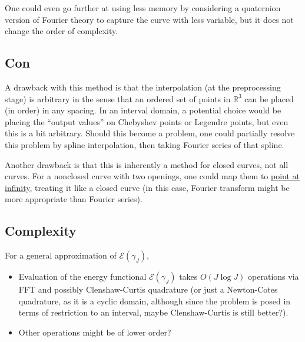 \documentclass[a4paper]{article}
\begin{document}
One could even go further at using less memory by considering a quaternion version of Fourier theory to capture the curve with less variable, but it does not change the order of complexity.

\subsection{Con}
A drawback with this method is that the interpolation (at the preprocessing stage) is arbitrary in the sense that an ordered set of points in $\mathbb{R}^3$ can be placed (in order) in any spacing.
In an interval domain, a potential choice would be placing the ``output values'' on Chebyshev points or Legendre points, but even this is a bit arbitrary.
Should this become a problem, one could partially resolve this problem by spline interpolation, then taking Fourier series of that spline.

Another drawback is that this is inherently a method for closed curves, not all curves. For a nonclosed curve with two openings, one could map them to \underline{point at infinity}, treating it like a closed curve (in this case, Fourier transform might be more appropriate than Fourier series).


\subsection{Complexity}
For a general approximation of $\mathcal{E}\left( \gamma_J \right)$,
\begin{itemize}
    \item Evaluation of the energy functional $\mathcal{E} \left( \gamma_J \right)$ takes $O\left( J \log J \right)$ operations via FFT and possibly Clenshaw-Curtis quadrature (or just a Newton-Cotes quadrature, as it is a cyclic domain, although since the problem is posed in terms of restriction to an interval, maybe Clenshaw-Curtis is still better?).
    \item Other operations might be of lower order? 
\end{itemize}
\end{document}
